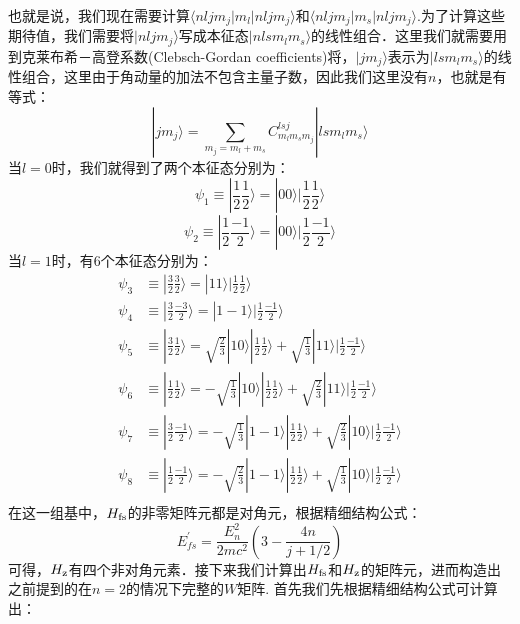 也就是说，我们现在需要计算$\langle nljm_j|m_l|nljm_j\rangle$和$\langle nljm_j|m_s|nljm_j\rangle$.为了计算这些期待值，我们需要将$|nljm_j\rangle$写成本征态$|nlsm_lm_s\rangle$的线性组合．这里我们就需要用到克莱布希－高登系数(Clebsch-Gordan coefficients)将，$|jm_j\rangle$表示为$|lsm_lm_s\rangle$的线性组合，这里由于角动量的加法不包含主量子数，因此我们这里没有$n$，也就是有等式：
\begin{equation}
|jm_j\rangle = \sum_{m_j=m_l+m_s}C^{lsj}_{m_lm_sm_j}|lsm_lm_s\rangle
\end{equation}
当$l=0$时，我们就得到了两个本征态分别为：
\begin{equation}
\psi_1\equiv|\frac{1}{2}\frac{1}{2}\rangle=|00\rangle|\frac{1}{2}\frac{1}{2}\rangle
\end{equation}
\begin{equation}
\psi_2\equiv|\frac{1}{2}\frac{-1}{2}\rangle=|00\rangle|\frac{1}{2}\frac{-1}{2}\rangle
\end{equation}
当$l=1$时，有$6$个本征态分别为：
\begin{align}
\psi_3&\equiv|\frac{3}{2}\frac{3}{2}\rangle=|11\rangle|\frac{1}{2}\frac{1}{2}\rangle\\
\psi_4&\equiv|\frac{3}{2}\frac{-3}{2}\rangle=|1-1\rangle|\frac{1}{2}\frac{-1}{2}\rangle\\
\psi_5&\equiv|\frac{3}{2}\frac{1}{2}\rangle=\sqrt{\frac{2}{3}}|10\rangle|\frac{1}{2}\frac{1}{2}\rangle+\sqrt{\frac{1}{3}}|11\rangle|\frac{1}{2}\frac{-1}{2}\rangle\\
\psi_6&\equiv|\frac{1}{2}\frac{1}{2}\rangle=-\sqrt{\frac{1}{3}}|10\rangle|\frac{1}{2}\frac{1}{2}\rangle+\sqrt{\frac{2}{3}}|11\rangle|\frac{1}{2}\frac{-1}{2}\rangle\\
\psi_7&\equiv|\frac{3}{2}\frac{-1}{2}\rangle=-\sqrt{\frac{1}{3}}|1-1\rangle|\frac{1}{2}\frac{1}{2}\rangle+\sqrt{\frac{2}{3}}|10\rangle|\frac{1}{2}\frac{-1}{2}\rangle\\
\psi_8&\equiv|\frac{1}{2}\frac{-1}{2}\rangle=-\sqrt{\frac{2}{3}}|1-1\rangle|\frac{1}{2}\frac{1}{2}\rangle+\sqrt{\frac{1}{3}}|10\rangle|\frac{1}{2}\frac{-1}{2}\rangle\\
\end{align}
在这一组基中，$H_{\rm{fs}}$的非零矩阵元都是对角元，根据精细结构公式：
\begin{equation}
E_{fs}^{'}=\frac{E_n^2}{2mc^2}\left(3-\frac{4n}{j+1/2}\right)
\end{equation}
可得，$H_{\rm{z}}$有四个非对角元素．接下来我们计算出$H_{\rm{fs}}$和$H_{\rm{z}}$的矩阵元，进而构造出之前提到的在$n=2$的情况下完整的$W$矩阵. 
首先我们先根据精细结构公式可计算出：
